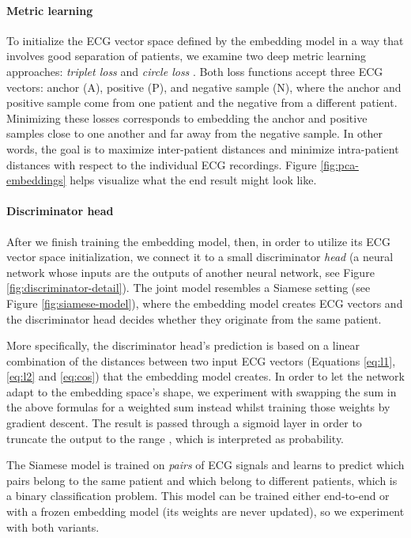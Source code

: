 \documentclass[preprint,12pt]{elsarticle}
\begin{document}
\paragraph{Metric learning}

To initialize the ECG vector space defined by the embedding model in a way that involves good separation of patients, we examine two deep metric learning approaches: \textit{triplet loss} \cite{hoffer2015deep, schroff2015facenet} and \textit{circle loss} \cite{sun2020circle}. Both loss functions accept three ECG vectors: anchor (A), positive (P), and negative sample (N), where the anchor and positive sample come from one patient and the negative from a different patient. Minimizing these losses corresponds to embedding the anchor and positive samples close to one another and far away from the negative sample. In other words, the goal is to maximize inter-patient distances and minimize intra-patient distances with respect to the individual ECG recordings. Figure \ref{fig:pca-embeddings} helps visualize what the end result might look like.



\paragraph{Discriminator head}

After we finish training the embedding model, then, in order to utilize its ECG vector space initialization, we connect it to a small discriminator \textit{head} (a neural network whose inputs are the outputs of another neural network, see Figure \ref{fig:discriminator-detail}). The joint model resembles a Siamese setting (see Figure \ref{fig:siamese-model}), where the embedding model creates ECG vectors and the discriminator head decides whether they originate from the same patient.



More specifically, the discriminator head's prediction is based on a linear combination of the distances between two input ECG vectors (Equations \ref{eq:l1}, \ref{eq:l2} and \ref{eq:cos}) that the embedding model creates. In order to let the network adapt to the embedding space's shape, we experiment with swapping the sum in the above formulas for a weighted sum instead whilst training those weights by gradient descent. The result is passed through a sigmoid layer in order to truncate the output to the range , which is interpreted as probability. 

The Siamese model is trained on \textit{pairs} of ECG signals and learns to predict which pairs belong to the same patient and which belong to different patients, which is a binary classification problem. This model can be trained either end-to-end or with a frozen embedding model (its weights are never updated), so we experiment with both variants.
\end{document}
